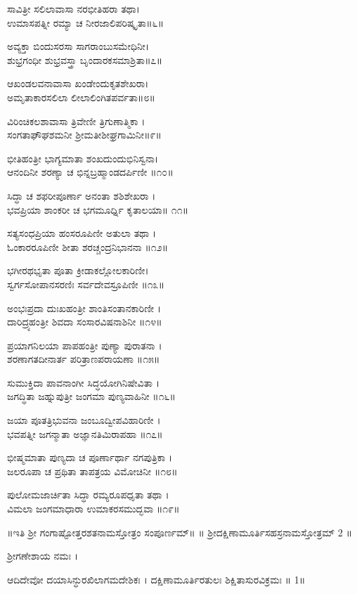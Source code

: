 ಸಾವಿತ್ರೀ ಸಲಿಲಾವಾಸಾ ನರಭೀತಿಹರಾ ತಥಾ।\\
ಉಮಾಸಪತ್ನೀ ರಮ್ಯಾ ಚ ನೀರಜಾಲಿಪರಿಷ್ಕೃತಾ॥೬॥

ಅವ್ಯಕ್ತಾ ಬಿಂದುಸರಸಾ ಸಾಗರಾಂಬುಸಮೇಧಿನೀ।\\
ಶುಭ್ರಗಂಧೀ ಶುಭ್ರವಸ್ತ್ರಾ ಬೃಂದಾರಕಸಮಾಶ್ರಿತಾ॥೭॥

ಆಖಂಡಲವನಾವಾಸಾ ಖಂಡೇಂದುಕೃತಶೇಖರಾ।\\
ಅಮೃತಾಕಾರಸಲಿಲಾ ಲೀಲಾಲಿಂಗಿತಪರ್ವತಾ॥೮॥

ವಿರಿಂಚಿಕಲಶಾವಾಸಾ ತ್ರಿವೇಣೀ ತ್ರಿಗುಣಾತ್ಮಿಕಾ ।\\
ಸಂಗತಾಘೌಘಶಮನೀ ಶ್ರೀಮತೀಶೀಘ್ರಗಾಮಿನೀ॥೯॥

ಭೀತಿಹಂತ್ರೀ ಭಾಗ್ಯಮಾತಾ ಶಂಖದುಂದುಭಿನಿಸ್ವನಾ।\\
ಆನಂದಿನೀ ಶರಣ್ಯಾ ಚ ಭಿನ್ನಬ್ರಹ್ಮಾಂಡದರ್ಪಿಣೀ ॥೧೦॥

ಸಿದ್ಧಾ ಚ ಶಫರೀಪೂರ್ಣಾ ಅನಂತಾ ಶಶಿಶೇಖರಾ ।\\
ಭವಪ್ರಿಯಾ ಶಾಂಕರೀ ಚ ಭಗಮೂರ್ಧ್ನಿ ಕೃತಾಲಯಾ॥ ೧೧॥

ಸತ್ಯಸಂಧಪ್ರಿಯಾ ಹಂಸರೂಪಿಣೀ ಅತುಲಾ ತಥಾ ।\\
ಓಂಕಾರರೂಪಿಣೀ ಶೀತಾ ಶರಚ್ಚಂದ್ರನಿಭಾನನಾ ॥೧೨॥

ಭಗೀರಥಭೃತಾ ಪೂತಾ ಕ್ರೀಡಾಕಲ್ಲೋಲಕಾರಿಣೀ।\\
ಸ್ವರ್ಗಸೋಪಾನಸರಣಿಃ ಸರ್ವದೇವಸ್ರೂಪಿಣೀ ॥೧೩॥

ಅಂಭಃಪ್ರದಾ ದುಃಖಹಂತ್ರೀ ಶಾಂತಿಸಂತಾನಕಾರಿಣೀ ।\\
ದಾರಿದ್ರ್ಯಹಂತ್ರೀ ಶಿವದಾ ಸಂಸಾರವಿಷನಾಶಿನೀ ॥೧೪॥

ಪ್ರಯಾಗನಿಲಯಾ ಪಾಪಹಂತ್ರೀ ಪುಣ್ಯಾ ಪುರಾತನಾ ।\\
ಶರಣಾಗತದೀನಾರ್ತ ಪರಿತ್ರಾಣಪರಾಯಣಾ ॥೧೫॥

ಸುಮುಕ್ತಿದಾ ಪಾವನಾಂಗೀ ಸಿದ್ಧಯೋಗಿನಿಷೇವಿತಾ ।\\
ಜಗದ್ಧಿತಾ ಜಹ್ನುಪುತ್ರೀ ಜಂಗಮಾ ಪುಣ್ಯವಾಹಿನೀ ॥೧೬॥

ಜಯಾ ಪೂತತ್ರಿಭುವನಾ ಜಂಬೂದ್ವೀಪವಿಹಾರಿಣೀ ।\\
ಭವಪತ್ನೀ ಜಗನ್ಮಾತಾ ಅಜ್ಞಾನತಿಮಿರಾಪಹಾ ॥೧೭॥

ಭೀಷ್ಮಮಾತಾ ಪುಣ್ಯದಾ ಚ ಪೂರ್ಣಾರ್ಥಾ ನಗಪುತ್ರಿಕಾ ।\\
ಜಲರೂಪಾ ಚ ಪ್ರಥಿತಾ ತಾಪತ್ರಯ ವಿಮೋಚಿನೀ ॥೧೮॥

ಪುಲೋಮಜಾರ್ಚಿತಾ ಸಿದ್ಧಾ ರಮ್ಯರೂಪಧೃತಾ ತಥಾ ।\\
ವಿಮಲಾ ಜಂಗಮಾಧಾರಾ ಉಮಾಕರಸಮುದ್ಭವಾ ॥೧೯॥

 ॥ಇತಿ ಶ್ರೀ ಗಂಗಾಷ್ಟೋತ್ತರಶತನಾಮಸ್ತೋತ್ರಂ ಸಂಪೂರ್ಣಮ್॥
॥ ಶ್ರೀದಕ್ಷಿಣಾಮೂರ್ತಿಸಹಸ್ರನಾಮಸ್ತೋತ್ರಮ್ 2 ॥

ಶ್ರೀಗಣೇಶಾಯ ನಮಃ ।

ಆದಿದೇವೋ ದಯಾಸಿನ್ಧುರಖಿಲಾಗಮದೇಶಿಕಃ ।
ದಕ್ಷಿಣಾಮೂರ್ತಿರತುಲಃ ಶಿಕ್ಷಿತಾಸುರವಿಕ್ರಮಃ ॥ 1॥

